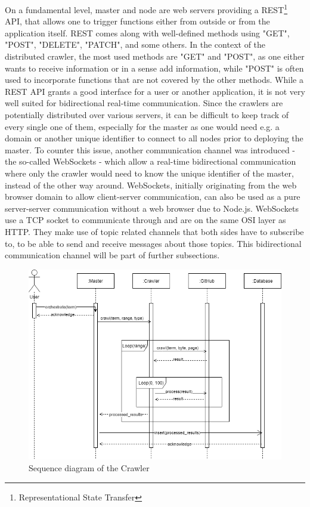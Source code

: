On a fundamental level, master and node are web servers providing a REST\footnote{Representational State Transfer} API, that allows one to trigger functions either from outside or from the application itself. REST comes along with well-defined methods using "GET", "POST", "DELETE", "PATCH", and some others. In the context of the distributed crawler, the most used methods are "GET" and "POST", as one either wants to receive information or in a sense add information, while "POST" is often used to incorporate functions that are not covered by the other methods.
While a REST API grants a good interface for a user or another application, it is not very well suited for bidirectional real-time communication. Since the crawlers are potentially distributed over various servers, it can be difficult to keep track of every single one of them, especially for the master as one would need e.g. a domain or another unique identifier to connect to all nodes prior to deploying the master. To counter this issue, another communication channel was introduced - the so-called WebSockets - which allow a real-time bidirectional communication where only the crawler would need to know the unique identifier of the master, instead of the other way around. WebSockets, initially originating from the web browser domain to allow client-server communication, can also be used as a pure server-server communication without a web browser due to Node.js. WebSockets use a TCP socket to communicate through and are on the same OSI layer as HTTP. They make use of topic related channels that both sides have to subscribe to, to be able to send and receive messages about those topics. This bidirectional communication channel will be part of further subsections.

\begin{figure}[H]
    \centering
    \includegraphics[scale=0.5]{graphics/crawler_sequence.png}
    \caption{Sequence diagram of the Crawler}
    \label{fig:seq_dia_crawler}
\end{figure}

